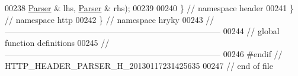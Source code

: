 \begin{DoxyCode}
00238         \hyperlink{classhryky_1_1http_1_1header_1_1_parser}{Parser} & lhs, \hyperlink{classhryky_1_1http_1_1header_1_1_parser}{Parser} & rhs);
00239 
00240 \} \textcolor{comment}{// namespace header}
00241 \} \textcolor{comment}{// namespace http}
00242 \} \textcolor{comment}{// namespace hryky}
00243 \textcolor{comment}{//
      ------------------------------------------------------------------------------}
00244 \textcolor{comment}{// global function definitions}
00245 \textcolor{comment}{//
      ------------------------------------------------------------------------------}
00246 \textcolor{preprocessor}{#endif // HTTP\_HEADER\_PARSER\_H\_20130117231425635}
00247 \textcolor{preprocessor}{}\textcolor{comment}{// end of file}
\end{DoxyCode}
